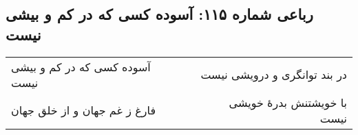 \begin{center}
\section*{رباعی شماره ۱۱۵: آسوده کسی که در کم و بیشی نیست}
\label{sec:0115}
\begin{longtable}{l p{0.5cm} r}
آسوده کسی که در کم و بیشی نیست
&&
در بند توانگری و درویشی نیست
\\
فارغ ز غم جهان و از خلق جهان
&&
با خویشتنش بدرهٔ خویشی نیست
\\
\end{longtable}
\end{center}
